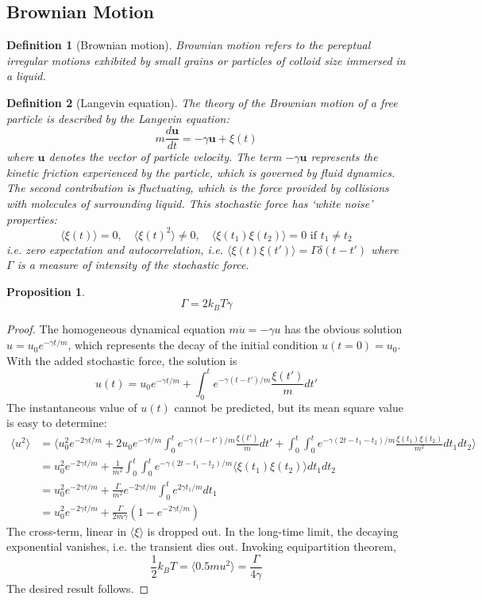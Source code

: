 \documentclass[a4paper]{article}
\theoremstyle{new}
\newtheorem{defi}{Definition}[section]
\newtheorem{prop}{Proposition}[section]
\begin{document}
\subsection{Brownian Motion}
\begin{defi}[Brownian motion]
Brownian motion refers to the pereptual irregular motions exhibited by small grains or particles of colloid size immersed in a liquid.
\end{defi}
\begin{defi}[Langevin equation]
The theory of the Brownian motion of a free particle is described by the Langevin equation:
$$m\frac{d\mathbf{u}}{dt}=-\gamma\mathbf{u}+\xi(t)$$
where $\mathbf{u}$ denotes the vector of particle velocity. The term $-\gamma\mathbf{u}$ represents the kinetic friction experienced by the particle, which is governed by fluid dynamics. The second contribution is fluctuating, which is the force provided by collisions with molecules of surrounding liquid. This stochastic force has `white noise' properties:
$$\langle\xi(t)\rangle=0,\quad\langle\xi(t)^2\rangle\neq 0,\quad\langle\xi(t_1)\xi(t_2)\rangle=0\text{ if }t_1\neq t_2$$
i.e. zero expectation and autocorrelation, i.e. $\langle\xi(t)\xi(t')\rangle=\Gamma\delta(t-t')$ where $\Gamma$ is a measure of intensity of the stochastic force.
\end{defi}
\begin{prop}
$$\Gamma=2k_BT\gamma$$
\end{prop}
\begin{proof}
The homogeneous dynamical equation $m\dot{u}=-\gamma u$ has the obvious solution $u=u_0e^{-\gamma t/m}$, which represents the decay of the initial condition $u(t=0)=u_0$. With the added stochastic force, the solution is
$$u(t)=u_0e^{-\gamma t/m}+\int_0^te^{-\gamma(t-t')/m}\frac{\xi(t')}{m}dt'$$
The instantaneous value of $u(t)$ cannot be predicted, but its mean square value is easy to determine:
\begin{align}
    \langle u^2\rangle&=\bigg\langle u_0^2e^{-2\gamma t/m}+2u_0e^{-\gamma t/m}\int_0^te^{-\gamma(t-t')/m}\frac{\xi(t')}{m}dt'+\int_0^t\int_0^te^{-\gamma(2t-t_1-t_2)/m}\frac{\xi(t_1)\xi(t_2)}{m^2}dt_1dt_2\bigg\rangle\nonumber\\&=u_0^2e^{-2\gamma t/m}+\frac{1}{m^2}\int_0^t\int_0^te^{-\gamma(2t-t_1-t_2)/m}\langle\xi(t_1)\xi(t_2)\rangle dt_1dt_2\nonumber\\&=u_0^2e^{-2\gamma t/m}+\frac{\Gamma}{m^2}e^{-2\gamma t/m}\int_0^te^{2\gamma t_1/m}dt_1\nonumber\\&=u_0^2e^{-2\gamma t/m}+\frac{\Gamma}{2m\gamma}(1-e^{-2\gamma t/m})\nonumber
\end{align}
The cross-term, linear in $\langle\xi\rangle$ is dropped out. In the long-time limit, the decaying exponential vanishes, i.e. the transient dies out. Invoking equipartition theorem,
$$\frac{1}{2}k_BT=\langle0.5mu^2\rangle=\frac{\Gamma}{4\gamma}$$
The desired result follows.
\end{proof}
\end{document}
